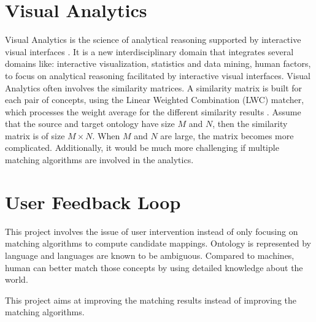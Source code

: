 \section{Visual Analytics} %
\label{sub:analytics}
    Visual Analytics is the science of analytical reasoning supported by interactive visual interfaces \cite{bertini2010investigating}. It is a new interdisciplinary domain that integrates several domains like: interactive visualization, statistics and data mining, human factors, to focus on analytical reasoning facilitated by interactive visual interfaces. Visual Analytics often involves the similarity matrices. A similarity matrix is built for each pair of concepts, using the Linear Weighted Combination (LWC) matcher, which processes the weight average for the different similarity results \cite{Cruz:2009:AEM:1687553.1687598}. Assume that the source and target ontology have size $M$ and $N$, then the similarity matrix is of size $M \times N$. When $M$ and $N$ are large, the matrix becomes more complicated. Additionally, it would be much more challenging if multiple matching algorithms are involved in the analytics.

\section{User Feedback Loop}	%
\label{sub:ufl}
   This project involves the issue of user intervention instead of only focusing on matching algorithms to compute candidate mappings. Ontology is represented by language and languages are known to be ambiguous. Compared to machines, human can better match those concepts by using detailed knowledge about the world.

   This project aims at improving the matching results instead of improving the matching algorithms. 

